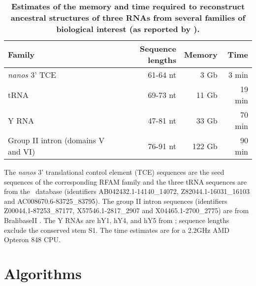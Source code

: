 \documentclass[10pt]{article}
\begin{document}
\begin{table}[!ht]
  \caption{
   \textbf{Estimates of the memory and time required to reconstruct ancestral
     structures of three RNAs from several families of biological interest
     (as reported by \indiegram).}}
 \begin{tabular}{|l|rrr|} \hline
    Family & Sequence lengths & Memory & Time \\ \hline
    \emph{nanos} 3' TCE & 61-64 nt & 3 Gb & 3 min \\ \hline
    tRNA & 69-73 nt & 11 Gb & 19 min \\ \hline
    Y RNA & 47-81 nt & 33 Gb & 70 min \\ \hline
    Group II intron (domains V and VI) & 76-91 nt & 122 Gb & 90 min \\ \hline
  \end{tabular}
  \begin{flushleft}
    The \emph{nanos} 3' translational control element (TCE) sequences
    are the seed sequences of the
    corresponding RFAM family \cite{GriffithsJonesEtAl2003} and the
    three tRNA sequences are from the \bralibaseII\ database
    \cite{GardnerEtAl2005} (identifiers AB042432.1-14140\_14072,
    Z82044.1-16031\_16103 and AC008670.6-83725\_83795). The group II
    intron sequences (identifiers Z00044.1-87253\_87177,
    X57546.1-2817\_2907 and X04465.1-2700\_2775) are from BralibaseII
    \cite{GardnerEtAl2005}.  The Y RNAs are hY1, hY4, and hY5 from
    \cite{TeunissenEtAl2000}; sequence lengths exclude the conserved
    stem S1.  The time estimates are for a 2.2GHz AMD Opteron 848 CPU.
  \end{flushleft}
\end{table}


\clearpage
\section*{Algorithms}
\end{document}

